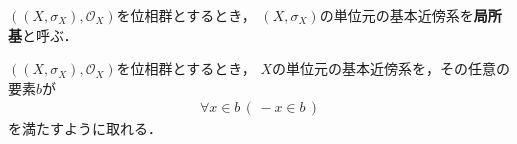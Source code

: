 	\begin{screen}
		\begin{dfn}[局所基]
			$\left(\left(X,\sigma_X\right),\mathscr{O}_X\right)$を位相群とするとき，
			$\left(X,\sigma_X\right)$の単位元の基本近傍系を{\bf 局所基}と呼ぶ．
		\end{dfn}
	\end{screen}
	
	\begin{screen}
		\begin{thm}[すべての要素が逆元で閉じている局所基が取れる]
		\label{thm:there_exists_a_local_base_whose_elements_are_closed_under_inversion}
			$\left(\left(X,\sigma_X\right),\mathscr{O}_X\right)$を位相群とするとき，
			$X$の単位元の基本近傍系を，その任意の要素$b$が
			\begin{align}
				\forall x \in b\, (\, -x \in b\, )
				\label{fom:thm_there_exists_a_local_base_whose_elements_are_closed_under_inversion}
			\end{align}
			を満たすように取れる．
		\end{thm}
	\end{screen}
	
